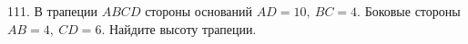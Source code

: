 111. В трапеции $ABCD$ стороны оснований $AD=10,\ BC=4.$ Боковые стороны $AB=4,\ CD=6.$ Найдите высоту трапеции.\\
